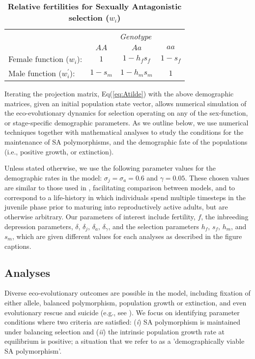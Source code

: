 \documentclass[11pt]{article}
\begin{document}
\begin{table}[htbp]
 \centering
 \caption{\bf Relative fertilities for Sexually Antagonistic selection ($w_{i}$)}
\label{tab:Fitness}
\begin{tabular}{lccc}
 \toprule
					&  \multicolumn{3}{c}{{\textit{Genotype}}} \\ 
\cline{2-4}
					& $AA$			& $Aa$ 					& $aa$ 		\\ \hline
Female function ($w_{i}$):	& $1$		& $1 - h_f s_f$	& $1 - s_f$ \\	
Male function ($w^{\prime}_{i}$):		& $1 - s_m$& $1 - h_m s_m$	& $1$ 		\\	
\hline
\end{tabular}
\end{table}

Iterating the projection matrix, Eq(\ref{eq:Atilde}) with the above demographic matrices, given an initial population state vector, allows numerical simulation of the eco-evolutionary dynamics for selection operating on any of the sex-function, or stage-specific demographic parameters. As we outline below, we use numerical techniques together with mathematical analyses to study the conditions for the maintenance of SA polymorphisms, and the demographic fate of the populations (i.e., positive growth, or extinction).

Unless stated otherwise, we use the following parameter values for the demographic rates in the model: $\sigma_j = \sigma_a = 0.6$ and $\gamma = 0.05$. These chosen values are similar to those used in \citet{deVriesCaswell2019b}, facilitating comparison between models, and to correspond to a life-history in which individuals spend multiple timesteps in the juvenile phase prior to maturing into reproductively active adults, but are otherwise arbitrary. Our parameters of interest include fertility, $f$, the inbreeding depression parameters, $\delta$, $\delta_j$, $\delta_a$, $\delta_{\gamma}$, and the selection parameters $h_f$, $s_f$, $h_m$, and $s_m$, which are given different values for each analyses as described in the figure captions. 

\subsection*{Analyses} \label{subsec:analyses}

Diverse eco-evolutionary outcomes are possible in the model, including fixation of either allele, balanced polymorphism, population growth or extinction, and even evolutionary rescue and suicide (e.g., see \citealt{deVriesCaswell2019a,deVriesCaswell2019b}). We focus on identifying parameter conditions where two criteria are satisfied: ({\itshape i}) SA polymorphism is maintained under balancing selection and ({\itshape ii}) the intrinsic population growth rate at equilibrium is positive; a situation that we refer to as a 'demographically viable SA polymorphism'.
\end{document}

